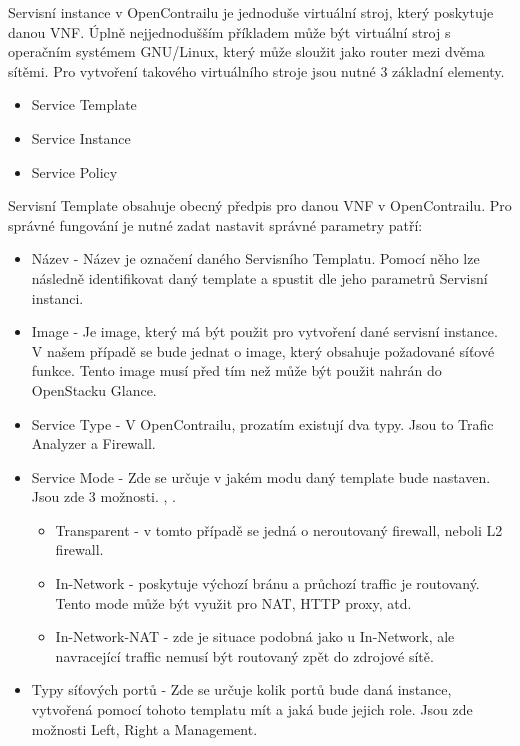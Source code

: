 Servisní instance v OpenContrailu je jednoduše virtuální stroj, který poskytuje danou VNF. Úplně nejjednodušším příkladem může být virtuální stroj s operačním systémem GNU/Linux, který může sloužit jako router mezi dvěma sítěmi. Pro vytvoření takového virtuálního stroje jsou nutné 3 základní elementy. 

\begin{itemize}
  \item Service Template
  \item Service Instance
  \item Service Policy
\end{itemize}

Servisní Template obsahuje obecný předpis pro danou VNF v OpenContrailu. Pro správné fungování je nutné zadat nastavit správné parametry patří:

\begin{itemize}
\item Název - Název je označení daného Servisního Templatu. Pomocí něho lze následně identifikovat daný template a spustit dle jeho parametrů Servisní instanci. 
\item Image - Je image, který má být použit pro vytvoření dané servisní instance. V našem případě se bude jednat o image, který obsahuje požadované síťové funkce. Tento image musí před tím než může být použit  nahrán do OpenStacku Glance.
\item Service Type - V OpenContrailu, prozatím existují dva typy. Jsou to Trafic Analyzer a Firewall.
\item Service Mode - Zde se určuje v jakém modu daný template bude nastaven. Jsou zde 3 možnosti. , .

  \begin{itemize}
  \item Transparent - v tomto případě se jedná o neroutovaný firewall, neboli L2 firewall.
  \item In-Network - poskytuje výchozí bránu a průchozí traffic je routovaný. Tento mode může být využit pro NAT, HTTP proxy, atd.
  \item In-Network-NAT - zde je situace podobná jako u In-Network, ale navracející traffic nemusí být routovaný zpět do zdrojové sítě.
  \end{itemize}

\item Typy síťových portů - Zde se určuje kolik portů bude daná instance, vytvořená pomocí tohoto templatu mít a jaká bude jejich role. Jsou zde možnosti Left, Right a Management. 
\end{itemize}

